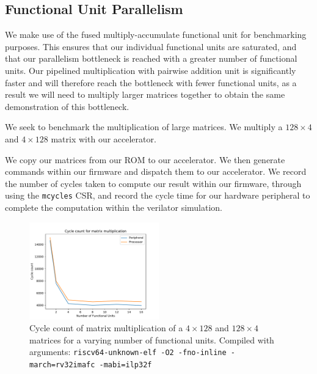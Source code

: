 \documentclass[a4paper,8pt]{report}
\begin{document}
\subsection{Functional Unit Parallelism}
We make use of the fused multiply-accumulate functional unit for benchmarking
purposes. This ensures that our individual functional units are saturated, and
that our parallelism bottleneck is reached with a greater number of functional
units. Our pipelined multiplication with pairwise addition unit is significantly
faster and will therefore reach the bottleneck with fewer functional units, as a
result we will need to multiply larger matrices together to obtain the same
demonstration of this bottleneck.

We seek to benchmark the multiplication of large matrices. We multiply a
$128\times 4$ and $4\times 128$ matrix with our accelerator.

We copy our matrices from our ROM to our accelerator. We then generate commands
within our firmware and dispatch them to our accelerator. We record the number
of cycles taken to compute our result within our firmware,
through using the \texttt{mcycles} CSR, and record the cycle time for our
hardware peripheral to complete the computation within the verilator simulation.

\begin{figure}[h]
  \centering
  \includegraphics[width=0.5\textwidth]{./py/c2_fu_unbuf.pdf}
  \caption{Cycle count of matrix multiplication of a $4 \times 128$ and $128
    \times 4$ matrices for a varying number of functional units. Compiled with
    arguments: \texttt{riscv64-unknown-elf -O2 -fno-inline -march=rv32imafc -mabi=ilp32f}}
  \label{fig:c2_fu_unbuf}
\end{figure}
\end{document}
